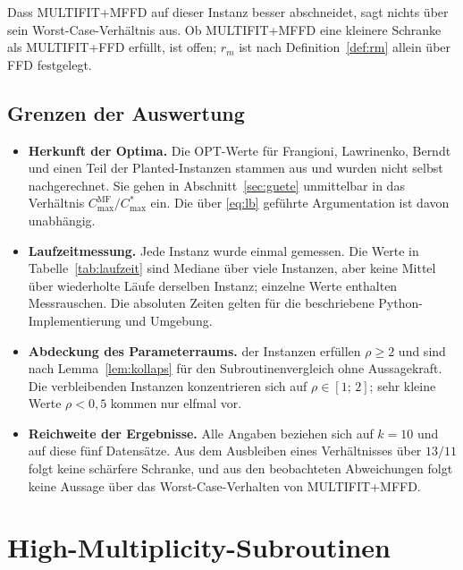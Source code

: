 Dass MULTIFIT+MFFD auf dieser Instanz besser abschneidet, sagt nichts über sein
Worst-Case-Verhältnis aus.
Ob MULTIFIT+MFFD eine kleinere Schranke als MULTIFIT+FFD erfüllt, ist offen; $r_m$ ist nach
Definition~\ref{def:rm} allein über FFD festgelegt.

\subsection{Grenzen der Auswertung}
\label{sec:grenzen}

\begin{itemize}
  \item \textbf{Herkunft der Optima.} Die OPT-Werte für Frangioni, Lawrinenko, Berndt und einen
    Teil der Planted-Instanzen stammen aus \textcite{akram2025} und wurden nicht selbst
    nachgerechnet. Sie gehen in Abschnitt~\ref{sec:guete} unmittelbar in das Verhältnis
    $C^{\mathrm{MF}}_{\max}/C^{*}_{\max}$ ein. Die über \eqref{eq:lb} geführte Argumentation ist davon
    unabhängig.
  \item \textbf{Laufzeitmessung.} Jede Instanz wurde einmal gemessen. Die Werte in
    Tabelle~\ref{tab:laufzeit} sind Mediane über viele Instanzen, aber keine Mittel über
    wiederholte Läufe derselben Instanz; einzelne Werte enthalten Messrauschen.
    Die absoluten Zeiten gelten für die beschriebene Python-Implementierung und Umgebung.
  \item \textbf{Abdeckung des Parameterraums.} \EvalRhoZweiProzent{} der Instanzen erfüllen
    $\rho \ge 2$ und sind nach Lemma~\ref{lem:kollaps} für den Subroutinenvergleich ohne
    Aussagekraft. Die verbleibenden \EvalRhoUnterZwei{} Instanzen konzentrieren sich auf
    $\rho \in [1;\,2]$; sehr kleine Werte $\rho < 0{,}5$ kommen nur elfmal vor.
  \item \textbf{Reichweite der Ergebnisse.} Alle Angaben beziehen sich auf $k = 10$ und auf
    diese fünf Datensätze. Aus dem Ausbleiben eines Verhältnisses über $13/11$ folgt keine
    schärfere Schranke, und aus den beobachteten Abweichungen folgt keine Aussage über das
    Worst-Case-Verhalten von MULTIFIT+MFFD.
\end{itemize}

\section{High-Multiplicity-Subroutinen}
\label{sec:hm}

